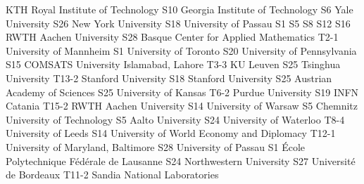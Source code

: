 \begin{multicols}{2}
{KTH Royal Institute of Technology}
{S10}
{}
{}
{}
{}
{}
{}
{Georgia Institute of Technology}
{S6}
{}
{}
{}
{}
{}
{}
{Yale University}
{S26}
{}
{}
{}
{}
{}
{}
{New York University}
{S18}
{}
{}
{}
{}
{}
{}
{University of Passau}
{S1}
{S5}
{S8}
{S12}
{S16}
{}
{}
{RWTH Aachen University}
{S28}
{}
{}
{}
{}
{}
{}
{Basque Center for Applied Mathematics}
{T2-1}
{}
{}
{}
{}
{}
{}
{University of Mannheim}
{S1}
{}
{}
{}
{}
{}
{}
{University of Toronto}
{S20}
{}
{}
{}
{}
{}
{}
{University of Pennsylvania}
{S15}
{}
{}
{}
{}
{}
{}
{COMSATS University Islamabad, Lahore}
{T3-3}
{}
{}
{}
{}
{}
{}
{KU Leuven}
{S25}
{}
{}
{}
{}
{}
{}
{Tsinghua University}
{T13-2}
{}
{}
{}
{}
{}
{}
{Stanford University}
{S18}
{}
{}
{}
{}
{}
{}
{Stanford University}
{S25}
{}
{}
{}
{}
{}
{}
{Austrian Academy of Sciences}
{S25}
{}
{}
{}
{}
{}
{}
{University of Kansas}
{T6-2}
{}
{}
{}
{}
{}
{}
{Purdue University}
{S19}
{}
{}
{}
{}
{}
{}
{INFN Catania}
{T15-2}
{}
{}
{}
{}
{}
{}
{RWTH Aachen University}
{S14}
{}
{}
{}
{}
{}
{}
{University of Warsaw}
{S5}
{}
{}
{}
{}
{}
{}
{Chemnitz University of Technology}
{S5}
{}
{}
{}
{}
{}
{}
{Aalto University}
{S24}
{}
{}
{}
{}
{}
{}
{University of Waterloo}
{T8-4}
{}
{}
{}
{}
{}
{}
{University of Leeds}
{S14}
{}
{}
{}
{}
{}
{}
{University of World Economy and Diplomacy}
{T12-1}
{}
{}
{}
{}
{}
{}
{University of Maryland, Baltimore}
{S28}
{}
{}
{}
{}
{}
{}
{University of Passau}
{S1}
{}
{}
{}
{}
{}
{}
{\'Ecole Polytechnique F\'ed\'erale de Lausanne}
{S24}
{}
{}
{}
{}
{}
{}
{Northwestern University}
{S27}
{}
{}
{}
{}
{}
{}
{Universit\'e de Bordeaux}
{T11-2}
{}
{}
{}
{}
{}
{}
{Sandia National Laboratories}

\end{multicols}
